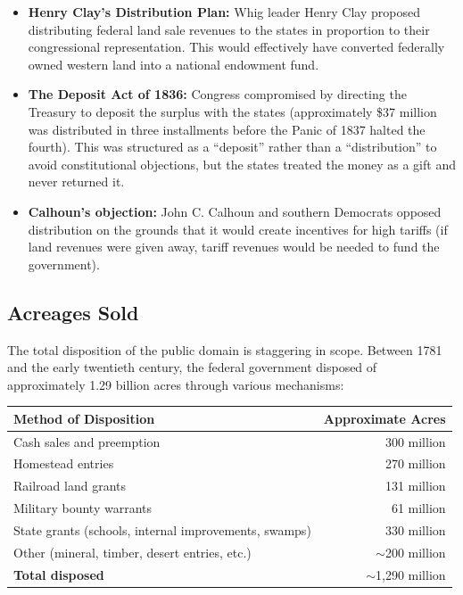 \documentclass[12pt]{article}
\begin{document}
\begin{itemize}
\item \textbf{Henry Clay's Distribution Plan:} Whig leader Henry Clay proposed distributing federal land sale revenues to the states in proportion to their congressional representation.  This would effectively have converted federally owned western land into a national endowment fund.
\item \textbf{The Deposit Act of 1836:} Congress compromised by directing the Treasury to deposit the surplus with the states (approximately \$37 million was distributed in three installments before the Panic of 1837 halted the fourth).  This was structured as a ``deposit'' rather than a ``distribution'' to avoid constitutional objections, but the states treated the money as a gift and never returned it.
\item \textbf{Calhoun's objection:} John C. Calhoun and southern Democrats opposed distribution on the grounds that it would create incentives for high tariffs (if land revenues were given away, tariff revenues would be needed to fund the government).
\end{itemize}

\subsection{Acreages Sold}

The total disposition of the public domain is staggering in scope.  Between 1781 and the early twentieth century, the federal government disposed of approximately 1.29 billion acres through various mechanisms:

\begin{center}
\begin{tabular}{lr}
\toprule
Method of Disposition & Approximate Acres \\
\midrule
Cash sales and preemption & 300 million \\
Homestead entries & 270 million \\
Railroad land grants & 131 million \\
Military bounty warrants & 61 million \\
State grants (schools, internal improvements, swamps) & 330 million \\
Other (mineral, timber, desert entries, etc.) & $\sim$200 million \\
\midrule
\textbf{Total disposed} & $\sim$1,290 million \\
\bottomrule
\end{tabular}
\end{center}
\end{document}

